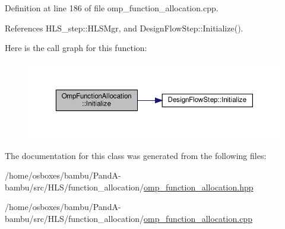 Definition at line 186 of file omp\+\_\+function\+\_\+allocation.\+cpp.



References H\+L\+S\+\_\+step\+::\+H\+L\+S\+Mgr, and Design\+Flow\+Step\+::\+Initialize().

Here is the call graph for this function\+:
\nopagebreak
\begin{figure}[H]
\begin{center}
\leavevmode
\includegraphics[width=350pt]{de/db2/classOmpFunctionAllocation_a7ed35644fe18a1430f3bcf546bef1c1a_cgraph}
\end{center}
\end{figure}


The documentation for this class was generated from the following files\+:\begin{DoxyCompactItemize}
\item 
/home/osboxes/bambu/\+Pand\+A-\/bambu/src/\+H\+L\+S/function\+\_\+allocation/\hyperlink{omp__function__allocation_8hpp}{omp\+\_\+function\+\_\+allocation.\+hpp}\item 
/home/osboxes/bambu/\+Pand\+A-\/bambu/src/\+H\+L\+S/function\+\_\+allocation/\hyperlink{omp__function__allocation_8cpp}{omp\+\_\+function\+\_\+allocation.\+cpp}\end{DoxyCompactItemize}
